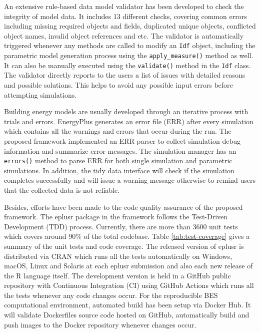 \documentclass[3p, times]{elsarticle} %
\begin{document}
An extensive rule-based data model validator has been developed to check the
integrity of model data.
It includes 13 different checks, covering common errors including missing
required objects and fields, duplicated unique objects, conflicted object
names, invalid object references and etc.
The validator is automatically triggered whenever any methods are called to
modify an \texttt{Idf} object, including the parametric model generation process using
the \texttt{apply\_measure()} method as well.
It can also be manually executed using the \texttt{validate()} method in the \texttt{Idf} class.
The validator directly reports to the users a list of issues with detailed reasons and possible solutions.
This helps to avoid any possible input errors before attempting simulations.

Building energy models are usually developed through an iterative process with trials and errors.
EnergyPlus generates an error file (ERR) after every simulation which contains
all the warnings and errors that occur during the run.
The proposed framework implemented an ERR parser to collect simulation debug
information and summarize error messages.
The simulation manager has an \texttt{errors()} method to parse ERR for both single
simulation and parametric simulations.
In addition, the tidy data interface will check if the simulation
completes successfully and will issue a warning message otherwise to remind
users that the collected data is not reliable.

Besides, efforts have been made to the code quality assurance of the proposed
framework. The eplusr package in the framework follows the Test-Driven
Development (TDD) process.
Currently, there are more than 3600 unit tests which covers around 90\% of the
total codebase. Table \ref{tab:test-coverage} gives a summary of the unit
tests and code coverage.
The released version of eplusr is distributed via CRAN which runs all the tests
automatically on Windows, macOS, Linux and Solaris at each eplusr submission
and also each new release of the R language itself.
The development version is held in a GitHub public repository with Continuous
Integration (CI) using GitHub Actions which runs all the tests whenever any
code changes occur.
For the reproducible BES computational environment, automated build has been
setup via Docker Hub.
It will validate Dockerfiles source code hosted on GitHub, automatically build
and push images to the Docker repository whenever changes occur.
\end{document}
